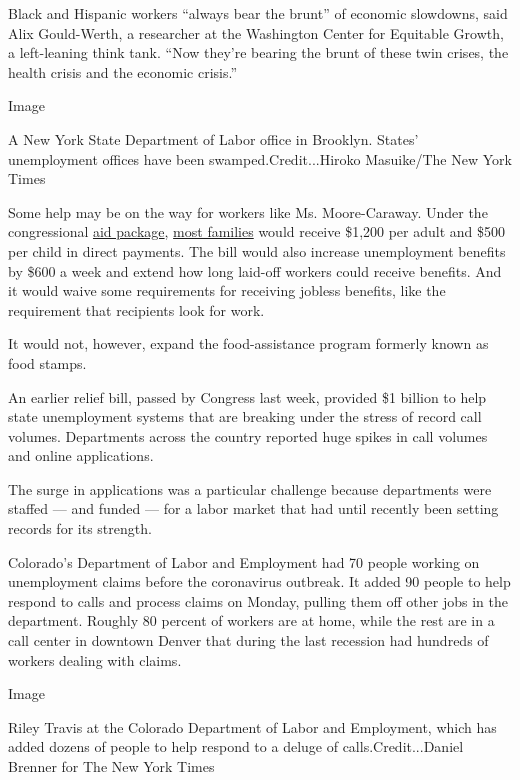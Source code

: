 Black and Hispanic workers ``always bear the brunt'' of economic
slowdowns, said Alix Gould-Werth, a researcher at the Washington Center
for Equitable Growth, a left-leaning think tank. ``Now they're bearing
the brunt of these twin crises, the health crisis and the economic
crisis.''

Image

A New York State Department of Labor office in Brooklyn. States'
unemployment offices have been swamped.Credit...Hiroko Masuike/The New
York Times

Some help may be on the way for workers like Ms. Moore-Caraway. Under
the congressional
\href{https://www.nytimes.com/2020/03/25/us/politics/whats-in-coronavirus-stimulus-bill.html?action=click\&module=Spotlight\&pgtype=Homepage}{aid
package},
\href{https://www.nytimes.com/article/coronavirus-stimulus-package-questions-answers.html}{most
families} would receive \$1,200 per adult and \$500 per child in direct
payments. The bill would also increase unemployment benefits by \$600 a
week and extend how long laid-off workers could receive benefits. And it
would waive some requirements for receiving jobless benefits, like the
requirement that recipients look for work.

It would not, however, expand the food-assistance program formerly known
as food stamps.

An earlier relief bill, passed by Congress last week, provided \$1
billion to help state unemployment systems that are breaking under the
stress of record call volumes. Departments across the country reported
huge spikes in call volumes and online applications.

The surge in applications was a particular challenge because departments
were staffed --- and funded --- for a labor market that had until
recently been setting records for its strength.

Colorado's Department of Labor and Employment had 70 people working on
unemployment claims before the coronavirus outbreak. It added 90 people
to help respond to calls and process claims on Monday, pulling them off
other jobs in the department. Roughly 80 percent of workers are at home,
while the rest are in a call center in downtown Denver that during the
last recession had hundreds of workers dealing with claims.

Image

Riley Travis at the Colorado Department of Labor and Employment, which
has added dozens of people to help respond to a deluge of
calls.Credit...Daniel Brenner for The New York Times

